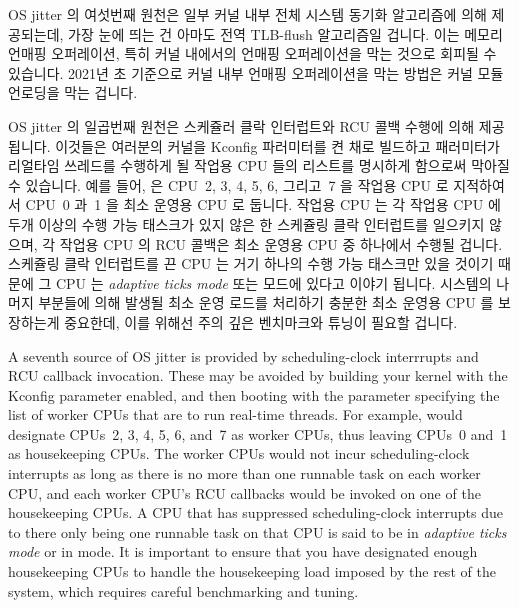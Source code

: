 \fi

OS jitter 의 여섯번째 원천은 일부 커널 내부 전체 시스템 동기화 알고리즘에 의해
제공되는데, 가장 눈에 띄는 건 아마도 전역 TLB-flush 알고리즘일 겁니다.
이는 메모리 언매핑 오퍼레이션, 특히 커널 내에서의 언매핑 오퍼레이션을 막는
것으로 회피될 수 있습니다.
2021년 초 기준으로 커널 내부 언매핑 오퍼레이션을 막는 방법은 커널 모듈 언로딩을
막는 겁니다.

OS jitter 의 일곱번째 원천은 스케쥴러 클락 인터럽트와 RCU 콜백 수행에 의해
제공됩니다.
이것들은 여러분의 커널을  Kconfig 파러미터를 켠 채로 빌드하고
 패러미터가 리얼타임 쓰레드를 수행하게 될 작업용 CPU 들의
리스트를 명시하게 함으로써 막아질 수 있습니다.
예를 들어,  은 CPU~2, 3, 4, 5, 6, 그리고~7 을 작업용 CPU 로
지적하여서 CPU~0 과~1 을 최소 운영용 CPU 로 둡니다.
작업용 CPU 는 각 작업용 CPU 에 두개 이상의 수행 가능 태스크가 있지 않은 한
스케쥴링 클락 인터럽트를 일으키지 않으며, 각 작업용 CPU 의 RCU 콜백은 최소
운영용 CPU 중 하나에서 수행될 겁니다.
스케쥴링 클락 인터럽트를 끈 CPU 는 거기 하나의 수행 가능 태스크만 있을 것이기
때문에 그 CPU 는 \emph{adaptive ticks mode} 또는  모드에 있다고
이야기 됩니다.
시스템의 나머지 부분들에 의해 발생될 최소 운영 로드를 처리하기 충분한 최소
운영용 CPU 를 보장하는게 중요한데, 이를 위해선 주의 깊은 벤치마크와 튜닝이
필요할 겁니다.

\iffalse

A seventh source of OS jitter is provided by
scheduling-clock interrrupts and RCU callback invocation.
These may be avoided by building your kernel with the
 Kconfig parameter enabled, and then booting
with the  parameter specifying the list of
worker CPUs that are to run real-time threads.
For example,  would designate CPUs~2, 3, 4, 5, 6, and~7
as worker CPUs, thus leaving CPUs~0 and~1 as housekeeping CPUs.
The worker CPUs would not incur scheduling-clock interrupts as long
as there is no more than one runnable task on each worker CPU,
and each worker CPU's RCU callbacks would be invoked on one of the
housekeeping CPUs.
A CPU that has suppressed scheduling-clock interrupts due to there
only being one runnable task on that CPU is said to be in
\emph{adaptive ticks mode} or in  mode.
It is important to ensure that you have designated enough
housekeeping CPUs to handle the housekeeping load imposed by the
rest of the system, which requires careful benchmarking and tuning.

